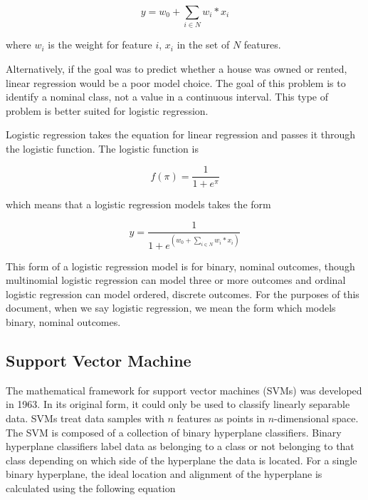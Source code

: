 \begin{equation}
y = w_0 + \sum_{i \in N} w_i*x_i
\end{equation}

\noindent where $w_i$ is the weight for feature $i$, $x_i$ in the set of $N$ features. 

Alternatively, if the goal was to predict whether a house was owned or rented, linear regression would be a poor model choice. The goal of this problem is to identify a nominal class, not a value in a continuous interval. This type of problem is better suited for logistic regression.

Logistic regression takes the equation for linear regression and passes it through the logistic function. %
The logistic function is 

\begin{equation}
f(\pi) = \frac{1}{1+e^{\pi}}
\end{equation}

\noindent which means that a logistic regression models takes the form

\begin{equation}
y = \frac{1}{1+e^{(w_0 + \sum_{i \in N} w_i*x_i)}}
\end{equation}

This form of a logistic regression model is for binary, nominal outcomes, though multinomial logistic regression can model three or more outcomes and ordinal logistic regression can model ordered, discrete outcomes. For the purposes of this document, when we say logistic regression, we mean the form which models binary, nominal outcomes. 


\subsection{Support Vector Machine}

The mathematical framework for support vector machines (SVMs) was developed in 1963. In its original form, it could only be used to classify linearly separable data. SVMs treat data samples with $n$ features as points in $n$-dimensional space. The SVM is composed of a collection of binary hyperplane classifiers. Binary hyperplane classifiers label data as belonging to a class or not belonging to that class depending on which side of the hyperplane the data is located. For a single binary hyperplane, the ideal location and alignment of the hyperplane is calculated using the following equation

